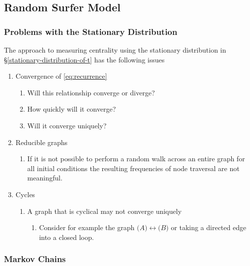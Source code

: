 \documentclass[11pt, twoside]{report}
\begin{document}
\subsection{Random Surfer Model}
\label{sec:org046df67}
\subsubsection{Problems with the Stationary Distribution}
\label{issues}
The approach to measuring centrality using the stationary distribution in \S\ref{stationary-distribution-of-t} has the following issues

\begin{enumerate}
\item Convergence of \eqref{eq:recurrence}
\begin{enumerate}
\item Will this relationship converge or diverge?
\item How quickly will it converge?
\item Will it converge uniquely?
\end{enumerate}
\item Reducible graphs
\begin{enumerate}
\item If it is not possible to perform a random walk across an entire graph for
all initial conditions the resulting frequencies of node traversal are not
meaningful.
\end{enumerate}
\item Cycles
\begin{enumerate}
\item A graph that is cyclical may not converge uniquely
\begin{enumerate}
\item Consider for example the graph \({\big (} A {\big )} \longleftrightarrow {\big (} B {\big )}\) or taking a directed edge into a closed loop.
\end{enumerate}
\end{enumerate}
\end{enumerate}

\subsubsection{Markov Chains}
\label{markov}
\end{document}
